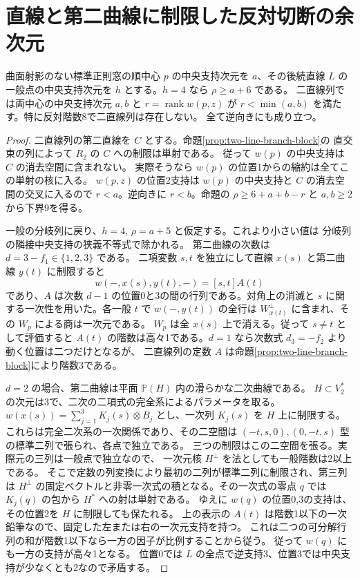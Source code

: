 \section{直線と第二曲線に制限した反対切断の余次元}
\label{sec:branch-rank-one-residual}
\begin{theorem}\label{thm:branch-rank-one-residual}
曲面射影のない標準正則窓の順中心 $p$ の中央支持次元を $a$、その後続直線 $L$ の
一般点の中央支持次元を $h$ とする。$h=4$ なら $\rho\ge a+6$ である。
二直線列では両中心の中央支持次元 $a,b$ と $r=\operatorname{rank} w(p,z)$ が
$r<\min(a,b)$ を満たす。特に反対階数8で二直線列は存在しない。
全て逆向きにも成り立つ。
\end{theorem}
\begin{proof}
二直線列の第二直線を $C$ とする。命題\ref{prop:two-line-branch-block}の
直交束の列によって $R_2$ の $C$ への制限は単射である。
従って $w(p)$ の中央支持は $C$ の消去空間に含まれない。
実際そうなら $w(p)$ の位置1からの縮約は全てこの単射の核に入る。
$w(p,z)$ の位置2支持は $w(p)$ の中央支持と $C$ の消去空間の交叉に入るので
$r<a$。逆向きに $r<b$。命題の $\rho\ge6+a+b-r$ と $a,b\ge2$ から下界9を得る。

一般の分岐列に戻り、$h=4$, $\rho=a+5$ と仮定する。これより小さい値は
分岐列の隣接中央支持の狭義不等式で除かれる。
第二曲線の次数は $d=3-f_1\in\{1,2,3\}$ である。
二項変数 $s,t$ を独立にして直線 $x(s)$ と第二曲線 $y(t)$ に制限すると
\[
             w(-,x(s),y(t),-)=[s,t]A(t)
\]
であり、$A$ は次数 $d-1$ の位置0と3の間の行列である。対角上の消滅と
$s$ に関する一次性を用いた。各一般 $t$ で $w(-,y(t))$ の全行は
$W_{x(t)}^\perp$ に含まれ、その $W_p$ による商は一次元である。
$W_p$ は全 $x(s)$ 上で消える。従って $s\ne t$ として評価すると
$A(t)$ の階数は高々1である。$d=1$ なら次数式 $d_3=-f_2$ より動く位置は二つだけとなるが、
二直線列の定数 $A$ は命題\ref{prop:two-line-branch-block}により階数3である。

$d=2$ の場合、第二曲線は平面 $\mathbb P(H)$ 内の滑らかな二次曲線である。
$H\subset V_2^*$ の次元は3で、二次の二項式の完全系によるパラメータを取る。
$w(x(s))=\sum_{j=1}^3 K_j(s)\otimes B_j$ とし、一次列 $K_j(s)$ を $H$ 上に制限する。
これらは完全二次系の一次関係であり、その二空間は
$(-t,s,0),(0,-t,s)$ 型の標準二列で張られ、各点で独立である。
三つの制限はこの二空間を張る。実際元の三列は一般点で独立なので、
一次元核 $H^\perp$ を法としても一般階数は2以上である。
そこで定数の列変換により最初の二列が標準二列に制限され、第三列は
$H^\perp$ の固定ベクトルと非零一次式の積となる。その一次式の零点 $q$ では
$K_j(q)$ の包から $H^*$ への射は単射である。
ゆえに $w(q)$ の位置0,3の支持は、その位置2を $H$ に制限しても保たれる。
上の表示の $A(t)$ は階数1以下の一次鉛筆なので、固定した左または右の一次元支持を持つ。
これは二つの可分解行列の和が階数1以下なら一方の因子が比例することから従う。
従って $w(q)$ にも一方の支持が高々1となる。
位置0では $L$ の全点で逆支持3、位置3では中央支持が少なくとも2なので矛盾する。


\end{proof}
